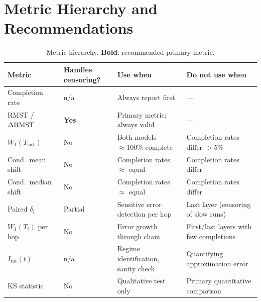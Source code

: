 \documentclass[11pt,a4paper]{article}
\begin{document}
\section{Metric Hierarchy and Recommendations}

\begin{table}[H]
\centering
\renewcommand{\arraystretch}{1.3}
\begin{tabular}{p{3.4cm}p{2.1cm}p{4.0cm}p{4.5cm}}
\toprule
\textbf{Metric} & \textbf{Handles censoring?} & \textbf{Use when} & \textbf{Do not use when} \\
\midrule
Completion rate          & n/a        & Always report first                 & --- \\
RMST / $\Delta\mathrm{RMST}$           & \textbf{Yes} & Primary metric; always valid       & --- \\
$W_1(T_{\mathrm{last}})$ & No         & Both models $\approx100\%$ complete & Completion rates differ $>5\%$ \\
Cond.\ mean shift        & No         & Completion rates $\approx$ equal    & Completion rates differ \\
Cond.\ median shift      & No         & Completion rates $\approx$ equal    & Completion rates differ \\
Paired $\delta_i$        & Partial    & Sensitive error detection per hop   & Last layer (censoring of slow runs) \\
$W_1(T_i)$ per hop       & No         & Error growth through chain          & First/last layers with few completions \\
$I_{\mathrm{tot}}(t)$    & n/a        & Regime identification, sanity check & Quantifying approximation error \\
KS statistic             & No         & Qualitative test only               & Primary quantitative comparison \\
\bottomrule
\end{tabular}
\caption{Metric hierarchy.  \textbf{Bold}: recommended primary metric.}
\label{tab:hierarchy}
\end{table}
\end{document}
